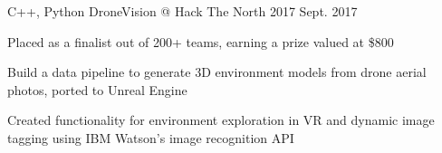 


\begin{cventries}


\cventry
{C++, Python} %
{DroneVision @ Hack The North 2017} %
{} %
{Sept. 2017} %
{ %
\begin{cvitems}
\item {Placed as a finalist out of 200+ teams, earning a prize valued at \$800}
\item {Build a data pipeline to generate 3D environment models from drone aerial photos, ported to Unreal Engine}
\item {Created functionality for environment exploration in VR and dynamic image tagging using IBM Watson's image recognition API}
\end{cvitems}
}


\end{cventries}